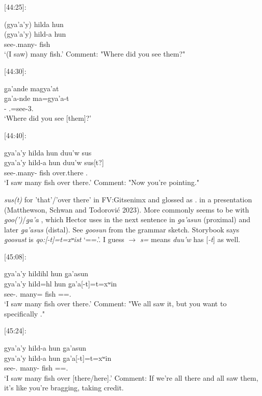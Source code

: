 [44:25]:
\begin{exe}
    \ex \glll
    (gya'a'y) hilda hun \\
    (gya'a'y) hild-a hun \\
    see-\Fsg.\Ii[=\Cn?] many-\Attr{} fish \\
    \glt `(I saw) many fish.' 
    Comment: "Where did you see them?"
\end{exe}

[44:30]:
\begin{exe}
    \ex \glll
    g̱a'ande magya'at \\
    g̱a'a-nde ma=gya'a-t \\
    \Loc-\Wh{} \Ssg.\I=see-3.\Ii  \\
    \glt `Where did you see [them]?'
\end{exe}

[44:40]:
\begin{exe}
    \ex \glll
    gya'a'y hilda hun duu'w sus \\
    gya'a'y hild-a hun  duu'w sus[t?] \\
    see-\Fsg.\Ii[=\Cn?] many-\Attr{} fish over.there \Dem.\Dist \\
    \glt `I saw many fish over there.' 
    Comment: "Now you're pointing."
\end{exe}

\textit{sus(t)} for 'that'/'over there' in FV:Gitsenimx and glossed as \Dem.\Dist{} in a presentation (Matthewson, Schwan and Todorović 2023). More commonly seems to be with \textit{g̱oo(')}/\textit{g̱a'a} \Loc, which Hector uses in the next sentence in \textit{g̱a'asun} (proximal) and later \textit{g̱a'asus} (distal). See \textit{g̱oosun} from the grammar sketch. Storybook says \textit{g̱oosust} is \textit{qo:[-t]=t=xʷist} `\Loc[3.\Ii]=\Pn=\Dem.\Dist'. I guess \Pn{} \(\rightarrow\) \textit{s=} means \textit{duu'w} has [\textit{-t}] as well.

[45:08]:
\begin{exe}
    \ex \glll
    gya'a'y hildihl hun g̱a'asun \\
    gya'a'y hild=hl hun  g̱a'a[-t]=t=xʷin \\
    see-\Fsg.\I{} many=\Cn{} fish \Loc[3.\Ii]=\Pn=\Dem.\Prox \\
    \glt `I saw many fish over there.' 
    Comment: "We all saw it, but you want to specifically ."
\end{exe}

[45:24]:
\begin{exe}
    \ex \glll
    gya'a'y hild-a hun g̱a'asun \\
    gya'a'y hild-a hun  g̱a'a[-t]=t=xʷin \\
    see-\Fsg.\I{} many-\Attr{} fish \Loc[3.\Ii]=\Pn=\Dem.\Prox \\
    \glt `I saw many fish over [there/here].' 
    Comment: If we're all there and all saw them, it's like you're bragging, taking credit. 
\end{exe}

